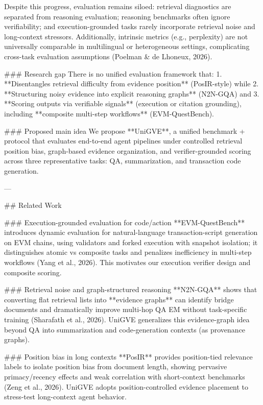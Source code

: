 Despite this progress, evaluation remains siloed: retrieval diagnostics are separated from reasoning evaluation; reasoning benchmarks often ignore verifiability; and execution-grounded tasks rarely incorporate retrieval noise and long-context stressors. Additionally, intrinsic metrics (e.g., perplexity) are not universally comparable in multilingual or heterogeneous settings, complicating cross-task evaluation assumptions (Poelman & de Lhoneux, 2026).  

### Research gap  
There is no unified evaluation framework that:  
1. **Disentangles retrieval difficulty from evidence position** (PosIR-style) while  
2. **Structuring noisy evidence into explicit reasoning graphs** (N2N-GQA) and  
3. **Scoring outputs via verifiable signals** (execution or citation grounding), including **composite multi-step workflows** (EVM-QuestBench).  

### Proposed main idea  
We propose **UniGVE**, a unified benchmark + protocol that evaluates end-to-end agent pipelines under controlled retrieval position bias, graph-based evidence organization, and verifier-grounded scoring across three representative tasks: QA, summarization, and transaction code generation.

---

## Related Work  

### Execution-grounded evaluation for code/action  
**EVM-QuestBench** introduces dynamic evaluation for natural-language transaction-script generation on EVM chains, using validators and forked execution with snapshot isolation; it distinguishes atomic vs composite tasks and penalizes inefficiency in multi-step workflows (Yang et al., 2026). This motivates our execution verifier design and composite scoring.

### Retrieval noise and graph-structured reasoning  
**N2N-GQA** shows that converting flat retrieval lists into **evidence graphs** can identify bridge documents and dramatically improve multi-hop QA EM without task-specific training (Sharafath et al., 2026). UniGVE generalizes this evidence-graph idea beyond QA into summarization and code-generation contexts (as provenance graphs).

### Position bias in long contexts  
**PosIR** provides position-tied relevance labels to isolate position bias from document length, showing pervasive primacy/recency effects and weak correlation with short-context benchmarks (Zeng et al., 2026). UniGVE adopts position-controlled evidence placement to stress-test long-context agent behavior.

